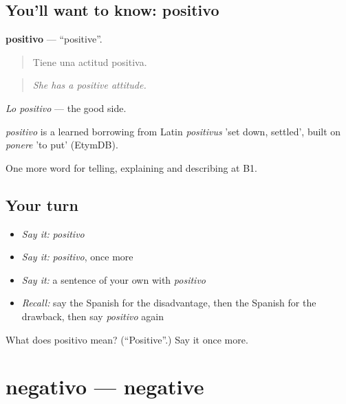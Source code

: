 \subsection*{You'll want to know: positivo}
\textbf{positivo} — \textquotedblleft{}positive\textquotedblright{}.

\begin{quote}
Tiene una actitud positiva.
\end{quote}

\begin{quote}
\emph{She has a positive attitude.}
\end{quote}

\emph{Lo positivo} — the good side.

\begin{cousinweb}
\emph{positivo} is a learned borrowing from Latin \emph{positivus} 'set down, settled', built on \emph{ponere} 'to put' (EtymDB).
\end{cousinweb}

\begin{grammarlens}[title={What you've built}]
One more word for telling, explaining and describing at B1.
\end{grammarlens}

\subsection*{Your turn}
\begin{itemize}
\raggedright
  \item \emph{Say it:} \emph{positivo}
  \item \emph{Say it:} \emph{positivo}, once more
  \item \emph{Say it:} a sentence of your own with \emph{positivo}
  \item \emph{Recall:} say the Spanish for the disadvantage, then the Spanish for the drawback, then say \emph{positivo} again
\end{itemize}

\begin{tcolorbox}[breakable,colback=teal!4,colframe=teal!35!black,title={Before you move on}]
What does positivo mean? (\textquotedblleft{}Positive\textquotedblright{}.) Say it once more.
\end{tcolorbox}
\section[negativo]{negativo — negative}

\label{lesson:ES-C584-negativo}




